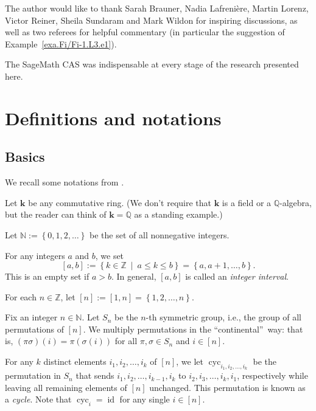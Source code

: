 \documentclass[numbers=enddot,12pt,final,onecolumn,notitlepage]{scrartcl}%
\theoremstyle{definition}
\newenvironment{noncompile}{}{}
\begin{document}
The author would like to thank Sarah Brauner, Nadia Lafreni\`{e}re, Martin
Lorenz, Victor Reiner, Sheila Sundaram and Mark Wildon for inspiring discussions,
as well as two referees for helpful commentary
(in particular the suggestion of Example~\ref{exa.Fi/Fi-1.L3.e1}).

\begin{noncompile}
The SageMath CAS \cite{sagemath} was indispensable at every stage of the
research presented here.
\end{noncompile}


\section{Definitions and notations}

\subsection{Basics}

We recall some notations from \cite{s2b1}.

Let $\mathbf{k}$ be any commutative ring. (We don't require that $\mathbf{k}$
is a field or a $\mathbb{Q}$-algebra, but the reader can think of
$\mathbf{k}=\mathbb{Q}$ as a standing example.)

Let $\mathbb{N}:=\left\{  0,1,2,\ldots\right\}  $ be the set of all
nonnegative integers.

For any integers $a$ and $b$, we set
\[
\left[  a,b\right]  :=\left\{  k\in\mathbb{Z}\ \mid\ a\leq k\leq b\right\}
=\left\{  a,a+1,\ldots,b\right\}  .
\]
This is an empty set if $a>b$. In general, $\left[  a,b\right]  $ is called an
\emph{integer interval}.

For each $n\in\mathbb{Z}$, let $\left[  n\right]  :=\left[  1,n\right]
=\left\{  1,2,\ldots,n\right\}  $.

Fix an integer $n\in\mathbb{N}$. Let $S_{n}$ be the $n$-th symmetric group,
i.e., the group of all permutations of $\left[  n\right]  $. We multiply
permutations in the \textquotedblleft continental\textquotedblright\ way: that
is, $\left(  \pi\sigma\right)  \left(  i\right)  =\pi\left(  \sigma\left(
i\right)  \right)  $ for all $\pi,\sigma\in S_{n}$ and $i\in\left[  n\right]
$.

For any $k$ distinct elements $i_{1},i_{2},\ldots,i_{k}$ of $\left[  n\right]
$, we let $\operatorname*{cyc}\nolimits_{i_{1},i_{2},\ldots,i_{k}}$ be the
permutation in $S_{n}$ that sends $i_{1},i_{2},\ldots,i_{k-1},i_{k}$ to
$i_{2},i_{3},\ldots,i_{k},i_{1}$, respectively while leaving all remaining
elements of $\left[  n\right]  $ unchanged. This permutation is known as a
\emph{cycle}. Note that $\operatorname*{cyc}\nolimits_{i}=\operatorname*{id}$
for any single $i\in\left[  n\right]  $.
\end{document}
